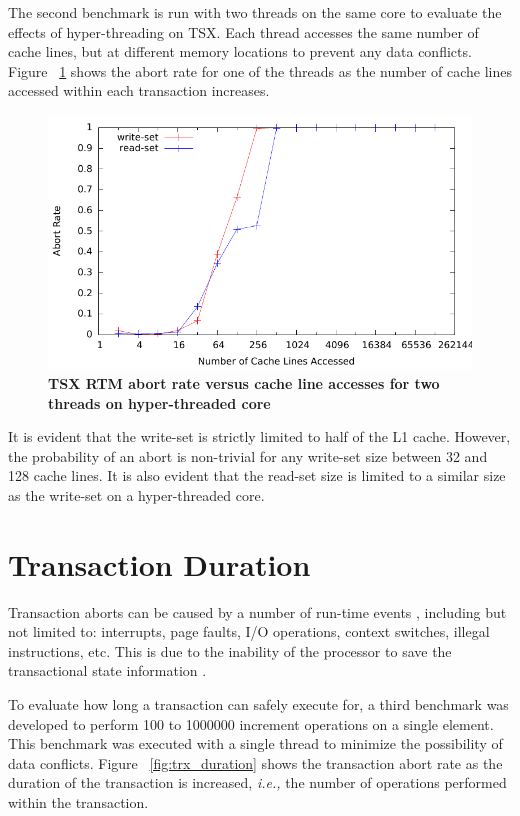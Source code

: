 \documentclass[11pt]{book}
\begin{document}
The second benchmark is run with two threads on the same core to evaluate the effects of
hyper-threading on TSX.  Each thread accesses the same number of cache lines, but at
different memory locations to prevent any data conflicts. Figure ~\ref{fig:trx_size_ht}
shows the abort rate for one of the threads as the number of cache lines accessed within
each transaction increases.

\begin{figure}[H]
    \centering
    \graphicspath{ {./figures/} }
    \includegraphics[width=\textwidth,height=\textheight,keepaspectratio]{trxSize_hyperthreaded}
    \caption{\textbf{TSX RTM abort rate versus cache line accesses for two 
    threads on hyper-threaded core}}
    \label{fig:trx_size_ht}
\end{figure}

It is evident that the write-set is strictly limited to half of the L1 cache.  However,
the probability of an abort is non-trivial for any write-set size between 32 and 128 cache
lines.  It is also evident that the read-set size is limited to a similar size as the
write-set on a hyper-threaded core.

\section{Transaction Duration}

Transaction aborts can be caused by a number of run-time events \cite{intel_prog_ref},
including but not limited to: interrupts, page faults, I/O operations, context switches,
illegal instructions, etc.  This is due to the inability of the processor to save the
transactional state information \cite{schwahn}.

To evaluate how long a transaction can safely execute for, a third benchmark was developed
to perform 100 to 1000000 increment operations on a single element.  This benchmark was
executed with a single thread to minimize the possibility of data conflicts. Figure
~\ref{fig:trx_duration} shows the transaction abort rate as the duration of the
transaction is increased, \emph{i.e.,} the number of operations performed within the transaction.
\end{document}
